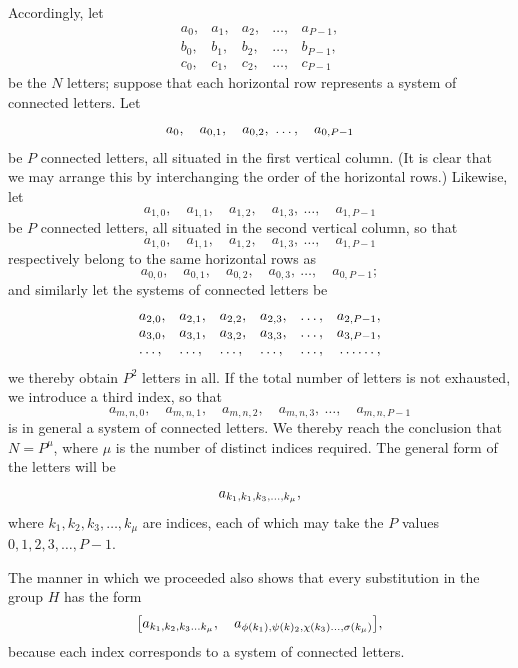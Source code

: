 Accordingly, let
\[
\begin{array}{*{5}{l}}
a_{0}, & a_{1}, & a_{2}, & \dots, & a_{P-1}, \\
b_{0}, & b_{1}, & b_{2}, & \dots, & b_{P-1}, \\
c_{0}, & c_{1}, & c_{2}, & \dots, & c_{P-1}
\end{array}
\]
be the $N$ letters; suppose that each horizontal row represents a system of
connected letters. Let
\[
\GalNotationAnomaly{a_{0}}{W10-NA001},\quad a_{0,1}, \quad a_{0,2}, \ \dots, \quad a_{0,P-1}
\]
be $P$ connected letters, all situated in the first vertical column. (It is
clear that we may arrange this by interchanging the order of the horizontal
rows.) Likewise, let
\[
a_{1,0}, \quad a_{1,1}, \quad a_{1,2}, \quad a_{1,3}, \ \dots, \quad a_{1,P-1}
\]
be $P$ connected letters, all situated in the second vertical column, so that
\[
a_{1,0}, \quad a_{1,1}, \quad a_{1,2}, \quad a_{1,3}, \ \dots, \quad a_{1,P-1}
\]
respectively belong to the same horizontal rows as
\[
a_{0,0}, \quad a_{0,1}, \quad a_{0,2}, \quad a_{0,3}, \ \dots, \quad a_{0,P-1};
\]
and similarly let the systems of connected letters be
\[
\begin{array}{*{6}{l}}
a_{2,0}, &a_{2,1}, &a_{2,2}, &a_{2,3}, & \dots, &a_{2,P-1}, \\
a_{3,0}, &a_{3,1}, &a_{3,2}, &a_{3,3}, & \dots, &a_{3,P-1}, \\
\dots,  & \dots,  & \dots, & \dots, & \dots, & \dotfill,
\end{array}
\]
we thereby obtain $P^{2}$ letters in all. If the total number of letters is not
exhausted, we introduce a third index, so that
\[
a_{m,n,0}, \quad a_{m,n,1}, \quad a_{m,n,2}, \quad a_{m,n,3},\ \dots, \quad a_{m,n,P-1}
\]
is in general a system of connected letters. We thereby reach the conclusion
that $N=P^{\mu}$, where $\mu$ is the number of distinct indices required. The
general form of the letters will be
\[
\GalPrintedError{a_{k_{1}, k_{1}, k_{3}, \dots, k_{\mu}}}{W10-PE001},
\]
where $k_{1},k_{2},k_{3},\dots,k_{\mu}$ are indices, each of which may take the
$P$ values $0,1,2,3,\dots,P-1$.

The manner in which we proceeded also shows that every substitution in the
group $H$ has the form
\[
\bigl[a_{k_{1}, k_{2}, k_{3} \dots k_{\mu}}, \quad
      \GalPrintedError{a_{\phi(k_{1}), \psi(k)_{2}, \chi(k_{3}) \dots, \sigma(k_{\mu})}}{W10-PE002}
\bigr],
\]
because each index corresponds to a system of connected letters.

